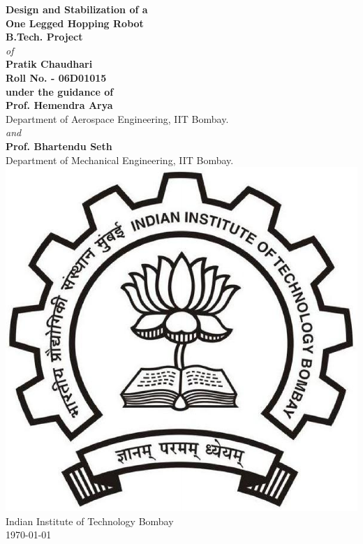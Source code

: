 \begin{titlepage}
\label{pg:title}
\begin{center}
\vspace*{0.5in}
{\bf \Huge Design and Stabilization of a}\\[0.25in]
{\bf \Huge One Legged Hopping Robot}\\[0.5in]
{\bf \Large B.Tech. Project}\\[0.25in]
{\normalsize \it of}\\[0.25in]
{\bf \Large Pratik Chaudhari}\\[0.2in]
{\bf \Large Roll No. - 06D01015}\\[0.8in]
{\bf \Large under the guidance of}\\[0.2in]
{{\bf \Large 	Prof. Hemendra Arya}\\
{\normalsize	 Department of Aerospace Engineering, IIT Bombay.}}\\[0.25in]
{\normalsize \it and}\\[0.25in]
{{\bf \Large Prof. Bhartendu Seth}\\
{\normalsize	 Department of Mechanical Engineering, IIT Bombay.}}\\[1in]
\includegraphics[scale=0.2]{fig/iitblogo.pdf} \\
Indian Institute of Technology Bombay\\
\today
\end{center}
\end{titlepage}

